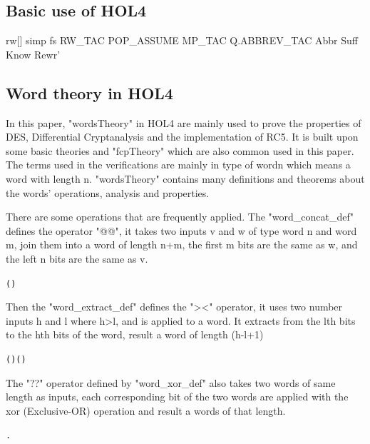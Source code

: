 \documentclass{article}
\begin{document}
\subsection{Basic use of HOL4}
rw[] simp fs
RW_TAC
POP_ASSUME MP_TAC
Q.ABBREV_TAC Abbr
Suff Know Rewr'

\subsection{Word theory in HOL4}
In this paper, "wordsTheory" in HOL4 are mainly used to prove the properties of DES, Differential Cryptanalysis
and the implementation of RC5. It is built upon some basic theories and "fcpTheory" which are also common used in
this paper. The terms used in the verifications are mainly in type of wordn which means a word with length n.
"wordsTheory" contains many definitions and theorems about the words' operations, analysis and properties.

There are some operations that are frequently applied. The "word_concat_def" defines the operator "@@", it takes two
inputs v and w of type word n and word m, join them into a word of length n+m, the first m bits are the same as w,
and the left n bits are the same as v.
\begin{alltt}
   \HOLTokenTurnstile{}    \HOLSymConst{=}  (  )
\end{alltt}

Then the "word_extract_def" defines the "><" operator, it uses two number inputs h and l where h>l, and is applied
to a word. It extracts from the lth bits to the hth bits of the word, result a word of length (h-l+1)
\begin{alltt}
   \HOLTokenTurnstile{} ( \HOLSymConst{\HOLTokenExtract{}} ) \HOLSymConst{=}  \HOLSymConst{\HOLTokenCompose} ( \HOLSymConst{--} )
\end{alltt}

The "??" operator defined by "word_xor_def" also takes two words of same length as inputs,
each corresponding bit of the two words are applied with the xor (Exclusive-OR) operation
and result a words of that length.
\begin{alltt}
   \HOLTokenTurnstile{}  \HOLSymConst{\HOLTokenEor{}}  \HOLSymConst{=}  .    \HOLSymConst{\HOLTokenNotEquiv{}}   
\end{alltt}
\end{document}
